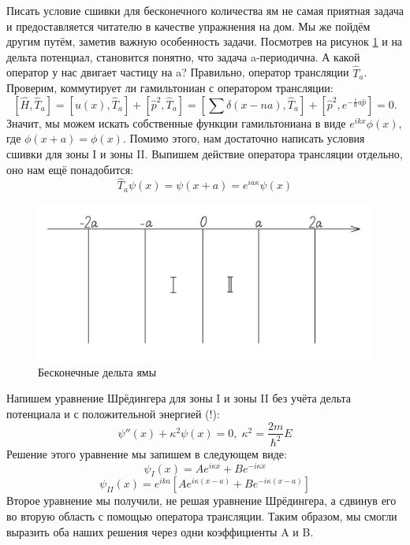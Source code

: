 Писать условие сшивки для бесконечного количества ям не самая приятная задача и предоставляется читателю в качестве упражнения на дом. Мы же пойдём другим путём, заметив важную особенность задачи. Посмотрев на рисунок \ref{fig 4.5} и на дельта потенциал, становится понятно, что задача a-периодична. А какой оператор у нас двигает частицу на a? Правильно, оператор трансляции $\hat{T}_a$. Проверим, коммутирует ли гамильтониан с оператором трансляции:
\[
[\hat{H}, \hat{T}_a] = [u(x), \hat{T}_a] + [\hat{p}^2, \hat{T}_a] = [\sum\delta(x-na), \hat{T}_a] + [\hat{p}^2, e^{-\frac{i}{\hbar}a\hat{p}}] = 0.
\]
Значит, мы можем искать собственные функции гамильтониана в виде $e^{ikx}\phi(x)$, где $\phi(x + a) = \phi(x)$. Помимо этого, нам достаточно написать условия сшивки для зоны I и зоны II. Выпишем действие оператора трансляции отдельно, оно нам ещё понадобится:
\[
\hat{T}_a\psi(x) = \psi(x+a) = e^{ia\kappa}\psi(x)
\]
\begin{figure}[h!]
\centering
\includegraphics[scale=0.27]{class 4/images/inf delta hole.png}
\caption{Бесконечные дельта ямы}
\label{fig 4.5}
\end{figure}

Напишем уравнение Шрёдингера для зоны I и зоны II без учёта дельта потенциала и с положительной энергией (!):
\[
\psi''(x) + \kappa^2\psi(x) = 0, \; \kappa^2 = \frac{2m}{\hbar^2}E
\]
Решение этого уравнение мы запишем в следующем виде:
\[
\psi_I(x) = Ae^{i\kappa x} + Be^{-i\kappa x}
\]
\[
\psi_{II}(x) = e^{ika}\left[Ae^{i\kappa(x-a)} + Be^{-i\kappa(x-a)}\right]
\]
Второе уравнение мы получили, не решая уравнение Шрёдингера, а сдвинув его во вторую область с помощью оператора трансляции. Таким образом, мы смогли выразить оба наших решения через одни коэффициенты A и B.

